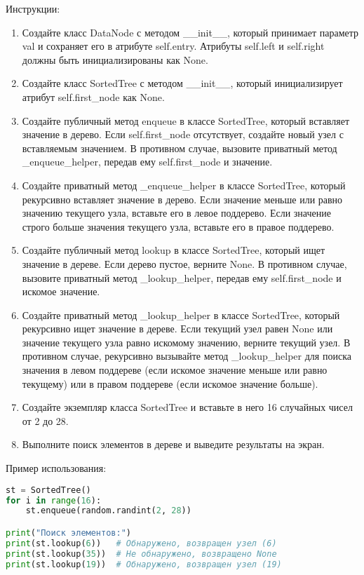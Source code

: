 \begin{enumerate}
Инструкции:
\begin{enumerate}
    \item Создайте класс DataNode с методом \_\_init\_\_, который принимает параметр val и сохраняет его в атрибуте self.entry. Атрибуты self.left и self.right должны быть инициализированы как None.
    \item Создайте класс SortedTree с методом \_\_init\_\_, который инициализирует атрибут self.first\_node как None.
    \item Создайте публичный метод enqueue в классе SortedTree, который вставляет значение в дерево. Если self.first\_node отсутствует, создайте новый узел с вставляемым значением. В противном случае, вызовите приватный метод \_enqueue\_helper, передав ему self.first\_node и значение.
    \item Создайте приватный метод \_enqueue\_helper в классе SortedTree, который рекурсивно вставляет значение в дерево. Если значение меньше или равно значению текущего узла, вставьте его в левое поддерево. Если значение строго больше значения текущего узла, вставьте его в правое поддерево.
    \item Создайте публичный метод lookup в классе SortedTree, который ищет значение в дереве. Если дерево пустое, верните None. В противном случае, вызовите приватный метод \_lookup\_helper, передав ему self.first\_node и искомое значение.
    \item Создайте приватный метод \_lookup\_helper в классе SortedTree, который рекурсивно ищет значение в дереве. Если текущий узел равен None или значение текущего узла равно искомому значению, верните текущий узел. В противном случае, рекурсивно вызывайте метод \_lookup\_helper для поиска значения в левом поддереве (если искомое значение меньше или равно текущему) или в правом поддереве (если искомое значение больше).
    \item Создайте экземпляр класса SortedTree и вставьте в него 16 случайных чисел от 2 до 28.
    \item Выполните поиск элементов в дереве и выведите результаты на экран.
\end{enumerate}

Пример использования:
\begin{lstlisting}[language=Python]
st = SortedTree()
for i in range(16):
    st.enqueue(random.randint(2, 28))

print("Поиск элементов:")
print(st.lookup(6))   # Обнаружено, возвращен узел (6)
print(st.lookup(35))  # Не обнаружено, возвращено None
print(st.lookup(19))  # Обнаружено, возвращен узел (19)
\end{lstlisting}


\end{enumerate}
